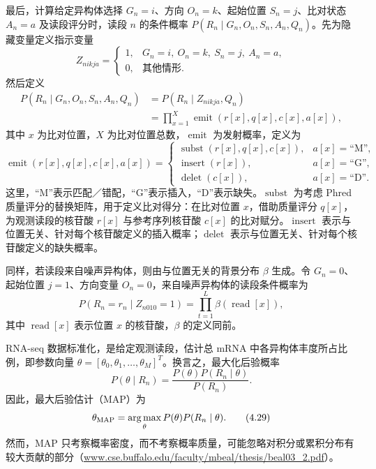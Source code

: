 最后，计算给定异构体选择 $G_n=i$、方向 $O_n=k$、起始位置 $S_n=j$、比对状态 $A_n=a$ 及读段评分时，读段 $n$ 的条件概率 $P(R_n\mid G_n,O_n,S_n,A_n,Q_n)$。先为隐藏变量定义指示变量
\begin{equation}
Z_{nikja}=\begin{cases}
1,&G_n=i,\ O_n=k,\ S_n=j,\ A_n=a,\\
0,&\text{其他情形}.
\end{cases}
\tag{4.24}
\end{equation}
然后定义
\begin{equation}
\begin{aligned}
P(R_n\mid G_n,O_n,S_n,A_n,Q_n)
&=P(R_n\mid Z_{nikja},Q_n)\\
&=\prod_{x=1}^{X}\operatorname{emit}(r[x],q[x],c[x],a[x]),
\end{aligned}
\tag{4.25}
\end{equation}
其中 $x$ 为比对位置，$X$ 为比对位置总数，$\operatorname{emit}$ 为发射概率，定义为
\begin{equation}
\operatorname{emit}(r[x],q[x],c[x],a[x])=
\begin{cases}
\operatorname{subst}(r[x],q[x],c[x]),&a[x]=\text{“M”},\\
\operatorname{insert}(r[x]),&a[x]=\text{“G”},\\
\operatorname{delet}(c[x]),&a[x]=\text{“D”}.
\end{cases}
\tag{4.26}
\end{equation}
这里，“M”表示匹配／错配，“G”表示插入，“D”表示缺失。$\operatorname{subst}$ 为考虑 Phred 质量评分的替换矩阵，用于定义比对得分：在比对位置 $x$，借助质量评分 $q[x]$，为观测读段的核苷酸 $r[x]$ 与参考序列核苷酸 $c[x]$ 的比对赋分。$\operatorname{insert}$ 表示与位置无关、针对每个核苷酸定义的插入概率；$\operatorname{delet}$ 表示与位置无关、针对每个核苷酸定义的缺失概率。

同样，若读段来自噪声异构体，则由与位置无关的背景分布 $\beta$ 生成。令 $G_n=0$、起始位置 $j=1$、方向变量 $O_n=0$，来自噪声异构体的读段条件概率为
\begin{equation}
P(R_n=r_n\mid Z_{n010}=1)=\prod_{t=1}^{L}\beta(\operatorname{read}[x]),
\tag{4.27}
\end{equation}
其中 $\operatorname{read}[x]$ 表示位置 $x$ 的核苷酸，$\beta$ 的定义同前。


RNA-seq 数据标准化，是给定观测读段，估计总 mRNA 中各异构体丰度所占比例，即参数向量 $\theta=[\theta_0,\theta_1,\ldots,\theta_M]^T$。换言之，最大化后验概率
\begin{equation}
P(\theta\mid R_n)=\frac{P(\theta)P(R_n\mid\theta)}{P(R_n)}.
\tag{4.28}
\end{equation}
因此，最大后验估计（MAP）为
\begin{equation}
\theta_{\mathrm{MAP}}=\operatorname*{arg\,max}_{\theta}P(\theta)P(R_n\mid\theta).
\tag{4.29}
\end{equation}
然而，MAP 只考察概率密度，而不考察概率质量，可能忽略对积分或累积分布有较大贡献的部分（\url{www.cse.buffalo.edu/faculty/mbeal/thesis/beal03_2.pdf}）。


